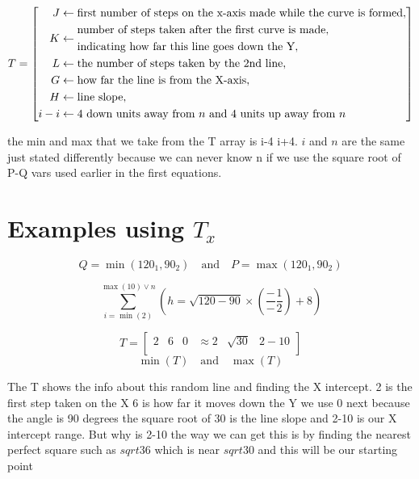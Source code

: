 \documentclass{article}
\begin{document}
\[
T = \left[ \begin{array}{@{}l@{}}
    \begin{aligned}
        J &\leftarrow \text{first number of steps on the x-axis made while the curve is formed}, \\
        K &\leftarrow \begin{aligned}&\text{number of steps taken after the first curve is made,} \\ &\text{indicating how far this line goes down the Y},\end{aligned} \\
        L &\leftarrow \text{the number of steps taken by the 2nd line}, \\
        G &\leftarrow \text{how far the line is from the X-axis}, \\
        H &\leftarrow \text{line slope}, \\
        i-i &\leftarrow 4 \text{ down units away from } n \text{ and 4 units up away from } n
    \end{aligned}
\end{array} \right]
\]

the min and max that we take from the T array is i-4 i+4. \(i\) and \(n\) are the same just stated differently because we can never know n if we use the square root of P-Q vars used earlier in the first equations.

 \section{Examples using \(T_x\)}

\[
Q = \min(120_1, 90_2) \quad \text{and} \quad P = \max(120_1, 90_2)
\]

\[
\sum_{i=\min(2)}^{\max(10) \vee n} \left( h = \sqrt{120 - 90} \times \left( \frac{-}{-} \frac{1}{2} \right) + 8 \right)
\]

\[
T = \begin{bmatrix}
    2 & 6 & 0 & \approx 2 & \sqrt{30} & 2-10 \\
\end{bmatrix}
\]
\[
\min(T) \quad \text{and} \quad \max(T)
\]

The T shows the info about this random line and finding the X intercept. 2 is the first step taken on the X 6 is how far it moves down the Y we use 0 next because the angle is 90 degrees the square root of 30 is the line slope and 2-10 is our X intercept range. But why is  2-10 the way we can get this is by finding the nearest perfect square such as \(sqrt{36}\) which is near \(sqrt{30}\) and this will be our starting point 
\end{document}
